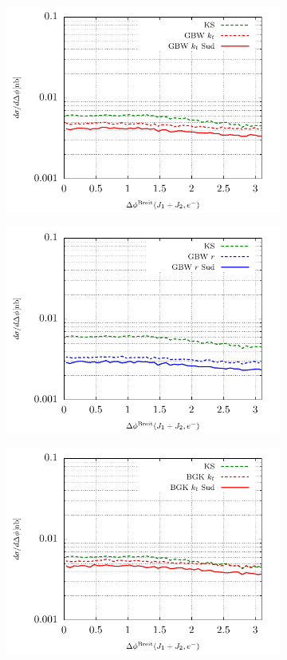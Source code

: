 \documentclass[12pt]{article}
\numberwithin{equation}{section}
\numberwithin{table}{section}
\numberwithin{figure}{section}
\begin{document}
\begin{figure}[p]
\begin{subfigure}{0.5\textwidth}
	\includegraphics[width=\textwidth]{plots/plotGBW2}
	\end{subfigure}
	\begin{subfigure}{0.5\textwidth}
	\includegraphics[width=\textwidth]{plots/plotGBW3}
	\end{subfigure}
	\begin{subfigure}{0.5\textwidth}
	\includegraphics[width=\textwidth]{plots/plotBGK2}

\end{subfigure}
\end{figure}
\end{document}
